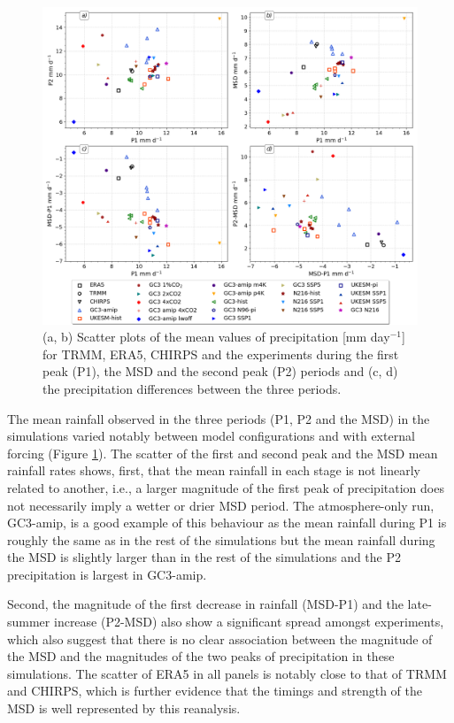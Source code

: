  
 
\label{sq:msdclim}
 \begin{figure}[t!]
\includegraphics[width=\linewidth]{figures/dumscatter_2.png}
\caption[Scatter plot of mean precipitation in different parts of seasonal cycle]{(a, b) Scatter plots of the mean values of precipitation [mm day$^{-1}$] for TRMM, ERA5, CHIRPS and the experiments during the first peak (P1), the MSD and the second peak (P2) periods and (c, d) the precipitation differences between the three periods. 
  }
\label{fig:scatter_msd}
\end{figure} 

The mean rainfall observed in the three periods (P1, P2 and the MSD) in the simulations varied notably between model configurations and with external forcing (Figure \ref{fig:scatter_msd}).
 The scatter of the first and second peak and the MSD mean rainfall rates  shows, first, that the mean rainfall in each stage is not linearly related to another, i.e., a larger magnitude of the first peak of precipitation does not necessarily imply a wetter or drier MSD period. The atmosphere-only run, GC3-amip, is a good example of this behaviour as the mean rainfall during P1 is roughly the same as in the rest of the simulations but the mean rainfall during the MSD is slightly larger than in the rest of the simulations and the P2 precipitation is largest in GC3-amip. 
 
 
Second, the magnitude of the first decrease in rainfall (MSD-P1) and the late-summer increase (P2-MSD) also show a significant spread amongst experiments, which also suggest that there is no clear association between the magnitude of the MSD and the magnitudes of the two peaks of precipitation in these simulations. The scatter of ERA5 in all panels is notably close to that of TRMM and CHIRPS, which is further evidence that the timings and strength of the MSD is well represented by this reanalysis.

